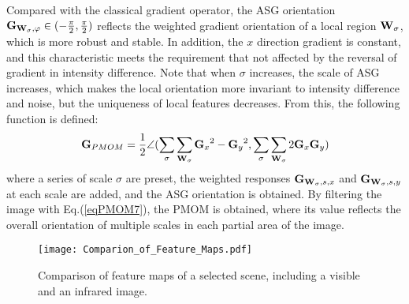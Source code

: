 Compared with the classical gradient operator, the ASG orientation ${{\bf{G}}_{{{\bf{W}}_\sigma},\varphi}}\in(-\frac{\pi}{2},\frac{\pi}{2})$ reflects the weighted gradient orientation of a local region ${\bf{W}}_\sigma$, which is more robust and stable. In addition, the $x$ direction gradient is constant, and this characteristic meets the requirement that not affected by the reversal of gradient in intensity difference. Note that when $\sigma$ increases, the scale of ASG increases, which makes the local orientation more invariant to intensity difference and noise, but the uniqueness of local features decreases. From this, the following function is defined:
\begin{equation} \label{eqPMOM7}
{{\bf{G}}_{PMOM}} = \frac{1}{2}\angle (\sum\limits_\sigma  {\sum\limits_{{\bf{W}}_\sigma } {{{\bf{G}}_x}^2 - {{\bf{G}}_y}^2}} ,\sum\limits_\sigma  {\sum\limits_{{\bf{W}}_\sigma } {2{{\bf{G}}_x}{{\bf{G}}_y}} } )
\end{equation}
where a series of scale $\sigma$ are preset, the weighted responses ${\bf{G}}_{{{\bf{W}}_\sigma},s,x}$ and ${\bf{G}}_{{{\bf{W}}_\sigma},s,y}$ at each scale are added, and the ASG orientation is obtained. By filtering the image with Eq.(\ref{eqPMOM7}), the PMOM is obtained, where its value reflects the overall orientation of multiple scales in each partial area of the image.

\begin{figure}[h!]
 \begin{center}
  \texttt{[image: Comparion\_of\_Feature\_Maps.pdf]}
  \caption{Comparison of feature maps of a selected scene, including a visible and an infrared image.}
  \label{fig:maps}
 \end{center}
\end{figure}

